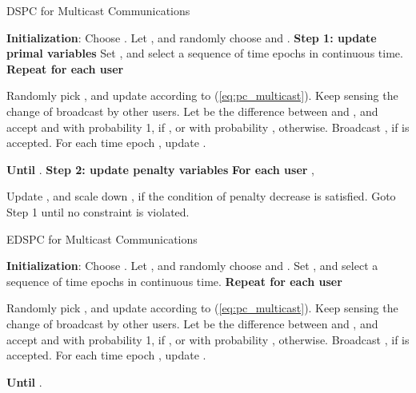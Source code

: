\documentclass[10pt,journal,letterpaper,compsoc]{IEEEtran}
\begin{document}
{{\begin{algorithm}
\caption{DSPC for Multicast Communications}
\label{alg:dspc_multicast}
\begin{algorithmic}
\STATE \textbf{Initialization}: Choose . Let ,  and randomly choose  and .
\STATE \textbf{Step 1: update primal variables}
\STATE Set , and select a sequence of time epochs  in continuous time.
\STATE \quad \textbf{Repeat for each user} 
\begin{enumerate}
\STATE Randomly pick , and update  according to (\ref{eq:pc_multicast}).
\STATE Keep sensing the change of  broadcast by other users.
\STATE Let  be the difference between  and , and accept  and  with probability 1, if , or with probability , otherwise.
\STATE Broadcast , if  is accepted.
\STATE For each time epoch , update .
\end{enumerate}
\STATE \quad \textbf{Until} .
\STATE \textbf{Step 2: update penalty variables}
\STATE \quad \textbf{For each user} ,
\begin{enumerate}
\STATE Update , and scale down , if the condition of penalty decrease is satisfied.
\STATE Goto Step 1 until no constraint is violated.
\end{enumerate}
\end{algorithmic}
\end{algorithm}


\begin{algorithm}
\caption{EDSPC for Multicast Communications}
\label{alg:hdspc_multicast}
\begin{algorithmic}
\STATE \textbf{Initialization}: Choose . Let ,  and randomly choose  and .
\STATE Set , and select a sequence of time epochs  in continuous time.
\STATE \textbf{Repeat for each user} 
\begin{enumerate}
\STATE Randomly pick , and update  according to (\ref{eq:pc_multicast}).
\STATE Keep sensing the change of  broadcast by other users.
\STATE Let  be the difference between  and , and accept  and  with probability 1, if , or with probability , otherwise.
\STATE Broadcast , if  is accepted.
\STATE For each time epoch , update .
\end{enumerate}
\STATE \textbf{Until} .
\end{algorithmic}
\end{algorithm}

}}
\end{document}
